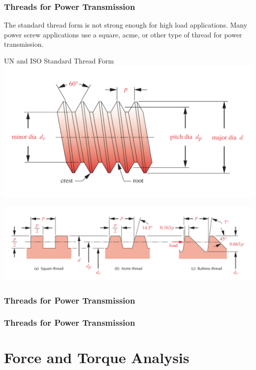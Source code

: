 \documentclass[fleqn]{beamer} %
\newcommand{\sectiontitleII}{Threads for Power Transmission}
\newcommand{\sectiontitleIII}{Force and Torque Analysis}
\begin{document}
	\begin{frame}[label=sectionII] \small
		\frametitle{\sectiontitleII}

		
		\begin{multicols}{2}
		The standard thread form is not strong enough for high load applications. Many power screw applications use a square, acme, or other type of thread for power transmission. \vspace{10mm}

		UN and ISO Standard Thread Form
		\includegraphics[scale=.1]{images/figure_15_2.png}
		\end{multicols}	

		\includegraphics[scale=.15]{images/figure_15_3.png}	

	\end{frame}

	\begin{frame}[label=sectionII] \small
		\frametitle{\sectiontitleII}


	\end{frame}

	\begin{frame}[label=sectionII] \small
		\frametitle{\sectiontitleII}
		
	
	\end{frame}

	
\section{\sectiontitleIII}	
\end{document}

